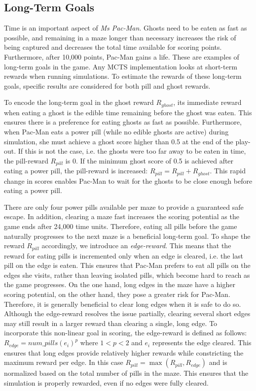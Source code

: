 \documentclass[journal]{IEEEtran}
\begin{document}
\subsection{Long-Term Goals}
\label{longterm}
Time is an important aspect of {\it{Ms Pac-Man}}. Ghosts need to be eaten as fast as possible, and remaining in a maze longer than necessary increases the risk of being captured and decreases the total time available for scoring points. Furthermore, after 10,000 points, Pac-Man gains a life. These are examples of long-term goals in the game. Any MCTS implementation looks at short-term rewards when running simulations. To estimate the rewards of these long-term goals, specific results are considered for both pill and ghost rewards.

To encode the long-term goal in the ghost reward $R_{ghost}$, its immediate reward when eating a ghost is the edible time remaining before the ghost was eaten. This ensures there is a preference for eating ghosts as fast as possible. Furthermore, when Pac-Man eats a power pill (while no edible ghosts are active) during simulation, she must achieve a ghost score higher than 0.5 at the end of the play-out. If this is not the case, i.e. the ghosts were too far away to be eaten in time, the pill-reward $R_{pill}$ is 0. If the minimum ghost score of 0.5 is achieved after eating a power pill, the pill-reward is increased: $R_{pill} = R_{pill} + R_{ghost}$. This rapid change in scores enables Pac-Man to wait for the ghosts to be close enough before eating a power pill.

There are only four power pills available per maze to provide a guaranteed safe escape. In addition, clearing a maze fast increases the scoring potential as the game ends after 24,000 time units. Therefore, eating all pills before the game naturally progresses to the next maze is a beneficial long-term goal. To shape the reward $R_{pill}$ accordingly, we introduce an \emph{edge-reward}. This means that the reward for eating pills is incremented only when an edge is cleared, i.e. the last pill on the edge is eaten. This ensures that Pac-Man prefers to eat all pills on the edges she visits, rather than leaving isolated pills, which become hard to reach as the game progresses. On the one hand, long edges in the maze have a higher scoring potential, on the other hand, they pose a greater risk for Pac-Man. Therefore, it is generally beneficial to clear long edges when it is safe to do so. Although the edge-reward resolves the issue partially, clearing several short edges may still result in a larger reward than clearing a single, long edge. To incorporate this non-linear goal in scoring, the edge-reward is defined as follows: $R_{edge} = {num\_pills(e_i)}^{p}$ where $1 < p < 2$ and $e_i$ represents the edge cleared. This ensures that long edges provide relatively higher rewards while constricting the maximum reward per edge. In this case $R_{pill} = \max(R_{pill}, R_{edge})$ and is normalized based on the total number of pills in the maze. This ensures that the simulation is properly rewarded, even if no edges were fully cleared.
\end{document}
